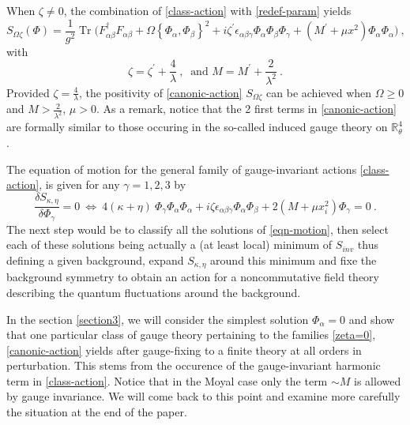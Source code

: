 \documentclass[a4paper,11pt,twoside]{article}
\numberwithin{equation}{section}
\DeclareMathOperator{\tr}{Tr}
\theoremstyle{nonumberplain}
\newcounter{and}
\begin{document}
%
When $\zeta\ne0$, the combination of \eqref{class-action} with \eqref{redef-param} yields%
%
\begin{equation}
S_{\Omega\zeta}(\Phi) = \frac{1}{g^2} \tr\bigg(F^\dag_{\alpha\beta}F_{\alpha\beta} + \Omega\left\{\Phi_\alpha,\Phi_\beta\right\}^2 + i \zeta^\prime\epsilon_{\alpha\beta\gamma} \Phi_\alpha \Phi_\beta \Phi_\gamma + \left(M^\prime+\mu x^2\right) \Phi_\alpha \Phi_\alpha \bigg) \ , \label{canonic-action}
\end{equation}
%
with%
%
\begin{equation}
\zeta = \zeta^\prime+\frac{4}{\lambda} \ , \ \mbox{ and }  M=M^\prime+\frac{2}{\lambda^2} \ . \label{new-param}
\end{equation}
%
Provided $\zeta=\frac{4}{\lambda}$, the positivity of \eqref{canonic-action} $S_{\Omega\zeta}$ can be achieved when $\Omega\ge0$ and $M>\frac{2}{\lambda^2}$, $\mu>0$. As a remark, notice that the 2 first terms in \eqref{canonic-action} are formally similar to those occuring in the so-called induced gauge theory on $\mathbb{R}^4_\theta$ \cite{GWW, GW07}.\par%
%
The equation of motion for the general family of gauge-invariant actions \eqref{class-action}, is given for any $\gamma=1,2,3$ by%
%
\begin{equation}
\frac{\delta S_{\kappa,\eta}}{\delta{\Phi}_\gamma}=0 \ \Longleftrightarrow \ 4 \left(\kappa+\eta\right) \ \Phi_\gamma \Phi_\alpha \Phi_\alpha + i \zeta \epsilon_{\alpha\beta\gamma} \Phi_\alpha \Phi_\beta + 2(M+\mu x_i^2) \Phi_\gamma = 0 \ . \label{eqn-motion}
\end{equation}
%
The next step would be to classify all the solutions of \eqref{eqn-motion}, then select each of these solutions being actually a (at least local) minimum of $S_{inv}$ thus defining a given background, expand $S_{\kappa,\eta}$ around this minimum and fixe the background symmetry to obtain an action for a noncommutative field theory describing the quantum fluctuations around the background.\par%
%
In the section \ref{section3}, we will consider the simplest solution $\Phi_\alpha=0$ and show that one particular class of gauge theory pertaining to the families \eqref{zeta=0}, \eqref{canonic-action} yields after gauge-fixing to a finite theory at all orders in perturbation. This stems from the occurence of the gauge-invariant harmonic term in \eqref{class-action}. Notice that in the Moyal case only the term $\sim M$ is allowed by gauge invariance. We will come back to this point and examine more carefully the situation at the end of the paper.\par%
\end{document}
